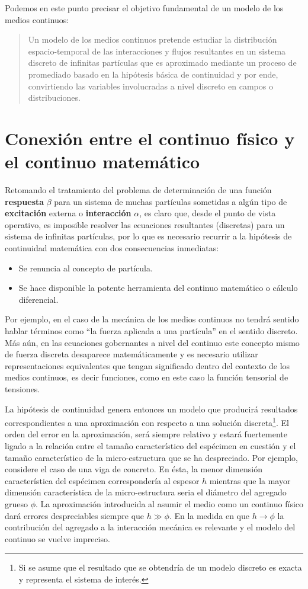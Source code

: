 \documentclass[../notas medios.tex]{subfiles}
\begin{document}
Podemos en este punto precisar el objetivo fundamental de un modelo de los medios continuos:
\begin{quote}
Un modelo de los medios continuos pretende estudiar la distribución 
espacio-temporal de las interacciones y flujos resultantes en un sistema 
discreto de infinitas partículas que es aproximado mediante un proceso de 
promediado basado en la hipótesis básica de continuidad y por ende, 
convirtiendo las variables involucradas a nivel discreto en campos o 
distribuciones.
\end{quote}

\section{Conexión entre el continuo físico y el continuo matemático}
Retomando el tratamiento del problema de determinación de una función {\bf
respuesta} $\beta$ para un sistema de muchas partículas sometidas a algún tipo de {\bf excitación} externa o {\bf interacción} $\alpha$, es
claro que, desde el punto de vista operativo, es imposible resolver las 
ecuaciones resultantes (discretas) para un sistema de infinitas partículas, por 
lo que es necesario recurrir a la hipótesis de continuidad matemática con dos 
consecuencias inmediatas:
\begin{itemize}
\item Se renuncia al concepto de partícula.
\item Se hace disponible la potente herramienta del continuo matemático o
cálculo diferencial.
\end{itemize}

Por ejemplo, en el caso de la mecánica de los medios continuos no tendrá sentido
hablar términos como ``la fuerza aplicada a una partícula” en el sentido 
discreto. Más aún, en las ecuaciones gobernantes a nivel del continuo este 
concepto mismo de fuerza discreta desaparece matemáticamente y es necesario 
utilizar representaciones equivalentes que tengan significado dentro del 
contexto de los medios continuos, es decir funciones, como en este caso la 
función tensorial de tensiones.

La hipótesis de continuidad genera entonces un modelo que producirá resultados 
correspondientes a una aproximación con respecto a una solución 
discreta\footnote{Si se asume que el resultado que se obtendría de un modelo 
discreto es exacta y representa el sistema de interés.}. El orden del error en 
la aproximación, será siempre relativo y estará fuertemente ligado a la 
relación entre el tamaño característico del espécimen en cuestión y el tamaño 
característico de la micro-estructura que se ha despreciado.  Por ejemplo, 
considere el caso de una viga de concreto.  En ésta, la menor dimensión 
característica del espécimen correspondería al espesor $h$ mientras que la 
mayor dimensión característica de la micro-estructura seria el diámetro del 
agregado grueso $\phi$.  La aproximación introducida al asumir el medio como un 
continuo físico dará errores despreciables siempre que $h \gg \phi$.  En la 
medida en que $h \to \phi$   la contribución del agregado a la interacción 
mecánica es relevante y el modelo del continuo se vuelve impreciso.
\end{document}
